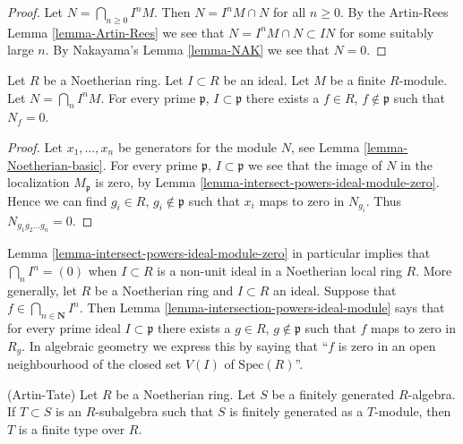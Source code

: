 \begin{proof}
Let $N = \bigcap_{n \geq 0} I^nM$.
Then $N = I^nM \cap N$ for all $n \geq 0$.
By the Artin-Rees Lemma \ref{lemma-Artin-Rees}
we see that $N = I^nM \cap N \subset IN$ for
some suitably large $n$. By Nakayama's Lemma \ref{lemma-NAK}
we see that $N = 0$.
\end{proof}

\begin{lemma}
\label{lemma-intersection-powers-ideal-module}
Let $R$ be a Noetherian ring.
Let $I \subset R$ be an ideal.
Let $M$ be a finite $R$-module.
Let $N = \bigcap_n I^n M$.
For every prime $\mathfrak p$,
$I \subset \mathfrak p$ there
exists a $f \in R$, $f \not \in \mathfrak p$
such that $N_f = 0$.
\end{lemma}

\begin{proof}
Let $x_1, \ldots, x_n$ be generators for the module $N$,
see Lemma \ref{lemma-Noetherian-basic}. For every prime
$\mathfrak p$, $I \subset \mathfrak p$ we see that
the image of $N$ in the localization $M_{\mathfrak p}$
is zero, by Lemma \ref{lemma-intersect-powers-ideal-module-zero}.
Hence we can find $g_i \in R$, $g_i \not \in \mathfrak p$
such that $x_i$ maps to zero in $N_{g_i}$. Thus
$N_{g_1g_2\ldots g_n} = 0$.
\end{proof}

\begin{remark}
\label{remark-intersection-powers-ideal}
Lemma \ref{lemma-intersect-powers-ideal-module-zero}
in particular implies that $\bigcap_n I^n = (0)$
when $I \subset R$ is a non-unit ideal in a Noetherian
local ring $R$. More generally, let $R$ be a Noetherian ring and
$I \subset R$ an ideal. Suppose that $f \in \bigcap_{n \in \mathbf{N}} I^n$.
Then Lemma \ref{lemma-intersection-powers-ideal-module}
says that for every prime ideal $I \subset \mathfrak p$
there exists a $g \in R$, $g \not \in \mathfrak p$
such that $f$ maps to zero in $R_g$. In algebraic geometry we
express this by saying that ``$f$ is zero in an open neighbourhood
of the closed set $V(I)$ of $\text{Spec}(R)$''.
\end{remark}

\begin{lemma}
\label{lemma-Artin-Tate}
(Artin-Tate) Let $R$ be a Noetherian ring. Let $S$ be a finitely
generated $R$-algebra. If $T \subset S$ is an $R$-subalgebra such
that $S$ is finitely generated as a $T$-module, then $T$ is a
finite type over $R$.
\end{lemma}

